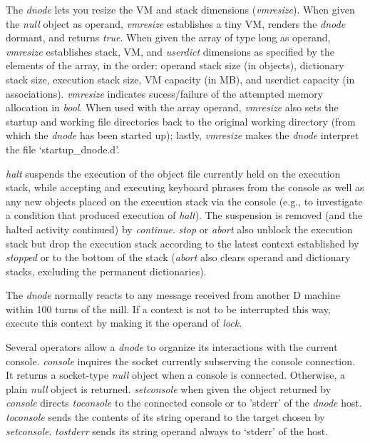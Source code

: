 The \emph{dnode} lets you resize the VM and stack dimensions (\emph{vmresize}). When given the \emph{null} object as operand, \emph{vmresize} establishes a tiny VM, renders the \emph{dnode} dormant, and returns \emph{true}. When given the array of type long as operand, \emph{vmresize} establishes stack, VM, and \emph{userdict} dimensions as specified by the elements of the array, in the order: operand stack size (in objects), dictionary stack size, execution stack size, VM capacity (in MB), and userdict capacity (in associations). \emph{vmresize} indicates sucess/failure of the attempted memory allocation in \emph{bool}. When used with the array operand, \emph{vmresize} also sets the startup and working file directories back to the original working directory (from which the \emph{dnode} has been started up); lastly, \emph{vmresize} makes the \emph{dnode} interpret the file `startup\_dnode.d'. 

\emph{halt} suspends the execution of the object file currently held on the execution stack, while accepting and executing keyboard phrases from the console as well as any new objects placed on the execution stack via the console (e.g., to investigate a condition that produced execution of \emph{halt}). The suspension is removed (and the halted activity continued) by \emph{continue}. \emph{stop} or \emph{abort} also unblock the execution stack but drop the execution stack according to the latest context established by \emph{stopped} or to the bottom of the stack (\emph{abort} also clears operand and dictionary stacks, excluding the permanent dictionaries).

The \emph{dnode} normally reacts to any message received from another D machine within 100 turns of the mill. If a context is not to be interrupted this way, execute this context by making it the operand of \emph{lock}.

Several operators allow a \emph{dnode} to organize its interactions with the current console. \emph{console} inquires the socket currently subserving the console connection. It returns a socket-type \emph{null} object when a console is connected. Otherwise, a plain \emph{null} object is returned. \emph{setconsole} when given the object returned by \emph{console} directs \emph{toconsole} to the connected console or to 'stderr' of the \emph{dnode} host. \emph{toconsole} sends the contents of its string operand to the target chosen by \emph{setconsole}. \emph{tostderr} sends its string operand always to `stderr' of the host.

